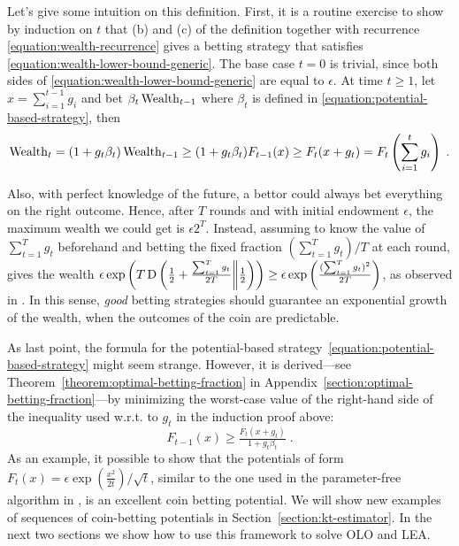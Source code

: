 Let's give some intuition on this definition.
First, it is a routine exercise to show by induction on $t$ that (b) and (c) of
the definition together with recurrence \eqref{equation:wealth-recurrence} gives a betting strategy that 
satisfies \eqref{equation:wealth-lower-bound-generic}. The base case $t=0$ is trivial,
since both sides of \eqref{equation:wealth-lower-bound-generic} are equal to
$\epsilon$. At time $t \ge 1$, let $x = \sum_{i=1}^{t-1} g_i$ and bet $\beta_t \operatorname{Wealth}_{t-1}$ where $\beta_t$ is defined in \eqref{equation:potential-based-strategy}, then
\vspace{-.2cm}
\[
\operatorname{Wealth}_t
= (1+g_t \beta_t) \operatorname{Wealth}_{t-1}
\ge (1 + g_t \beta_t) F_{t-1}(x)
\ge F_t(x + g_t)
= F_t \left( \sum_{i=1}^t g_i \right) \; .
\]

Also, with perfect knowledge of the future, a bettor could always bet everything on the right outcome. Hence, after $T$ rounds and with initial endowment $\epsilon$, the maximum wealth we could get is $\epsilon 2^T$. 
Instead, assuming to know the value of $\sum_{t=1}^T g_t$ beforehand and betting the fixed fraction $(\sum_{t=1}^T g_t)/T$ at each round, gives the wealth 
$\epsilon \exp\left(T \operatorname*{D}\left({\tfrac{1}{2}+\tfrac{\sum_{t=1}^T g_t}{2 T}}\middle\|{\tfrac{1}{2}}\right)\right) \geq \epsilon \exp\left(\tfrac{(\sum_{t=1}^T g_t)^2}{2 T}\right)$, as observed in \cite{McMahan-Abernethy-2013}.
In this sense, \emph{good} betting strategies should guarantee an exponential growth of the wealth, when the outcomes of the coin are predictable.

As last point, the formula for the potential-based
strategy~\eqref{equation:potential-based-strategy} might seem strange. However,
it is derived---see Theorem~\ref{theorem:optimal-betting-fraction} in
Appendix~\ref{section:optimal-betting-fraction}---by minimizing the worst-case value of the right-hand side of the
inequality used w.r.t. to $g_t$ in the induction proof above:
\[
F_{t-1}(x) \ge \tfrac{F_{t}(x + g_t)}{1+g_t\beta_t} \; .
\]
As an example, it possible to show that the potentials of form $F_t(x)=\epsilon \exp
\left(\tfrac{x^2}{2t}\right)/\sqrt{t}$, similar to the one used in the parameter-free algorithm in \cite{McMahan-Orabona-2014}, is an excellent coin betting potential.
We will show new examples of sequences of coin-betting potentials in
Section~\ref{section:kt-estimator}. In the next two sections we show how to use
this framework to solve \ac{OLO} and \ac{LEA}.
